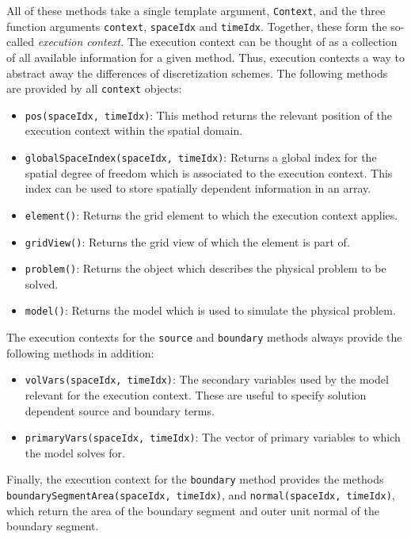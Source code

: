 All of these methods take a single template argument,
\texttt{Context}, and the three function arguments \texttt{context},
\texttt{spaceIdx} and \texttt{timeIdx}. Together, these form the
so-called \emph{execution context}. The execution context can be
thought of as a collection of all available information for a given
method. Thus, execution contexts a way to abstract away the
differences of discretization schemes. The following methods are
provided by all \texttt{context} objects:
\begin{itemize}
\item \texttt{pos(spaceIdx, timeIdx)}: This method returns the
  relevant position of the execution context within the spatial
  domain.
\item \texttt{globalSpaceIndex(spaceIdx, timeIdx)}: Returns a global
  index for the spatial degree of freedom which is associated to the
  execution context. This index can be used to store spatially
  dependent information in an array.
\item \texttt{element()}: Returns the \Dune grid element to which the
  execution context applies.
\item \texttt{gridView()}: Returns the \Dune grid view of which the
  element is part of.
\item \texttt{problem()}: Returns the \eWoms object which describes
  the physical problem to be solved.
\item \texttt{model()}: Returns the \eWoms model which is used to simulate
  the physical problem.
\end{itemize}

The execution contexts for the \texttt{source} and \texttt{boundary}
methods always provide the following methods in addition:
\begin{itemize}
\item \texttt{volVars(spaceIdx, timeIdx)}: The secondary variables
  used by the model relevant for the execution context. These are
  useful to specify solution dependent source and boundary terms.
\item \texttt{primaryVars(spaceIdx, timeIdx)}: The vector of primary
  variables to which the model solves for.
\end{itemize}

Finally, the execution context for the \texttt{boundary} method
provides the methods \texttt{boundarySegmentArea(spaceIdx, timeIdx)},
and \texttt{normal(spaceIdx, timeIdx)}, which return the area of the
boundary segment and outer unit normal of the boundary segment.

